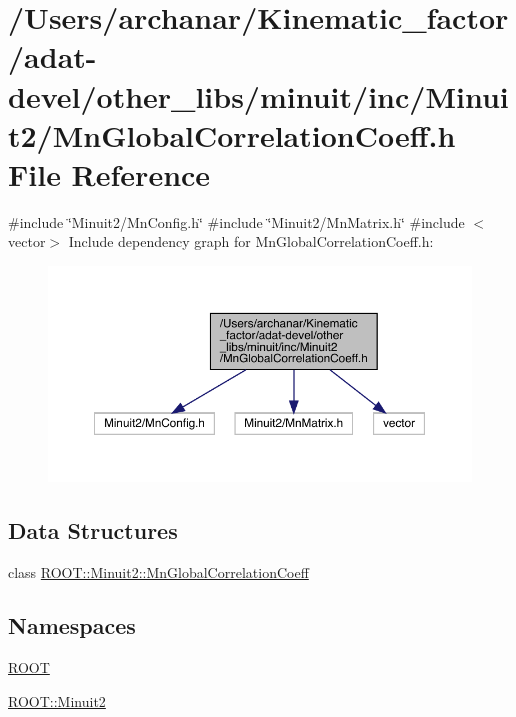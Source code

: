 \hypertarget{adat-devel_2other__libs_2minuit_2inc_2Minuit2_2MnGlobalCorrelationCoeff_8h}{}\section{/\+Users/archanar/\+Kinematic\+\_\+factor/adat-\/devel/other\+\_\+libs/minuit/inc/\+Minuit2/\+Mn\+Global\+Correlation\+Coeff.h File Reference}
\label{adat-devel_2other__libs_2minuit_2inc_2Minuit2_2MnGlobalCorrelationCoeff_8h}
{\ttfamily \#include \char`\"{}Minuit2/\+Mn\+Config.\+h\char`\"{}}\newline
{\ttfamily \#include \char`\"{}Minuit2/\+Mn\+Matrix.\+h\char`\"{}}\newline
{\ttfamily \#include $<$vector$>$}\newline
Include dependency graph for Mn\+Global\+Correlation\+Coeff.\+h\+:
\nopagebreak
\begin{figure}[H]
\begin{center}
\leavevmode
\includegraphics[width=350pt]{d2/d80/adat-devel_2other__libs_2minuit_2inc_2Minuit2_2MnGlobalCorrelationCoeff_8h__incl}
\end{center}
\end{figure}
\subsection*{Data Structures}
\begin{DoxyCompactItemize}
\item 
class \mbox{\hyperlink{classROOT_1_1Minuit2_1_1MnGlobalCorrelationCoeff}{R\+O\+O\+T\+::\+Minuit2\+::\+Mn\+Global\+Correlation\+Coeff}}
\end{DoxyCompactItemize}
\subsection*{Namespaces}
\begin{DoxyCompactItemize}
\item 
 \mbox{\hyperlink{namespaceROOT}{R\+O\+OT}}
\item 
 \mbox{\hyperlink{namespaceROOT_1_1Minuit2}{R\+O\+O\+T\+::\+Minuit2}}
\end{DoxyCompactItemize}
